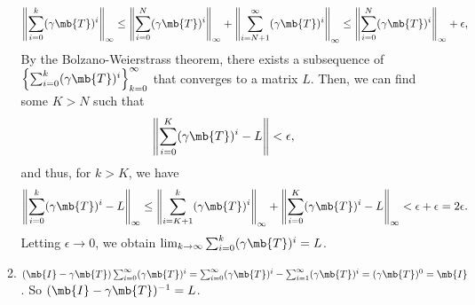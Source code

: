 \begin{exercise}
\begin{enumerate}
\begin{solution}
\begin{enumerate}
                        \begin{align*}
                            \left\|\sum_{i=0}^k (\gamma \mb{T})^i\right\|_\infty \le \left\|\sum_{i=0}^{N} (\gamma \mb{T})^i\right\|_\infty + \left\|\sum_{i=N+1}^\infty (\gamma \mb{T})^i\right\|_\infty \le \left\|\sum_{i=0}^{N} (\gamma \mb{T})^i\right\|_\infty + \epsilon,
                        \end{align*}
                        By the Bolzano-Weierstrass theorem, there exists a subsequence of $\left\{\sum_{i=0}^k (\gamma \mb{T})^i\right\}_{k=0}^\infty$ that converges to a matrix $L$. Then, we can find some $K > N$ such that
                        \begin{align*}
                            \left\|\sum_{i=0}^K (\gamma \mb{T})^i - L\right\| < \epsilon,
                        \end{align*}
                        and thus, for $k>K$, we have
                        \begin{align*}
                            \left\|\sum_{i=0}^k (\gamma \mb{T})^i - L\right\|_\infty \le \left\|\sum_{i=K+1}^k (\gamma \mb{T})^i\right\|_\infty + \left\|\sum_{i=0}^K (\gamma \mb{T})^i - L\right\|_\infty < \epsilon+\epsilon = 2\epsilon.
                        \end{align*}
                        Letting $\epsilon \to 0$, we obtain $\lim_{k\to\infty}\sum_{i=0}^k (\gamma \mb{T})^i = L$.
                    \item $(\mb{I} - \gamma \mb{T}) \sum_{i=0}^\infty (\gamma \mb{T})^i = \sum_{i=0}^\infty (\gamma \mb{T})^i - \sum_{i=1}^\infty (\gamma \mb{T})^i = (\gamma \mb{T})^0 = \mb{I}$. So $(\mb{I} - \gamma \mb{T})^{-1} = L$.
                        \qedhere
                \end{enumerate}
            \end{solution}
    \end{enumerate}
\end{exercise}





